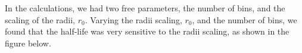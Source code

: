 \documentclass[a4paper]{article}
\begin{document}
\begin{comment}
\begin{table}[H]
    \centering
    \caption{Half-life of different nuclei\cite{nist}}
    \begin{tabular}{|c|c|}\hline
        Nuclei& Half-life [s]\\ \hline
        \isotope[238][92]{U} & $1.4\cdot10^{17}$\\\hline
        \isotope[232][90]{Th} & $4.4\cdot10^{17}$ \\\hline
        \isotope[226][88]{Ra} & $5.5\cdot10^{10}$ \\\hline
        \isotope[222][86]{Rn} & $3.3\cdot10^{5}$\\\hline
        \isotope[219][86]{Rn} & $3.96$\\\hline
        \isotope[214][82]{Po} & $164\cdot10^{-6}$\\\hline
    \end{tabular}
    \label{tab: half-life}
\end{table}\noindent
\begin{figure}[H]
    \centering
    \begin{tikzpicture}[]
        \begin{semilogyaxis}[
            xlabel = {$\mathcal{K}~ [MeV]$},
            ylabel = {$t_{1/2} ~[s]$},
            grid = both,
            grid style={line width=.1pt, draw=gray!10},
            major grid style={line width=.2pt,draw=gray!50},
            minor tick num=2,
            title = {Half-life as a function of $\mathcal{K}$},
            nodes near coords,
            ]
            \addplot+[scatter, only marks, scatter src = explicit symbolic]
            table [x=K,y=t, meta = name] {code/tab.dat};
        \end{semilogyaxis}
    \end{tikzpicture}
    \caption{Tabulated half life.}
\end{figure} 
\end{comment}
In the calculations, we had two free parameters, the number of bins, and the scaling of the radii, $r_0$.
Varying the radii scaling, $r_0$, and the number of bins, we found that the half-life was very sensitive to the radii scaling, as shown in the figure below.
\end{document}
